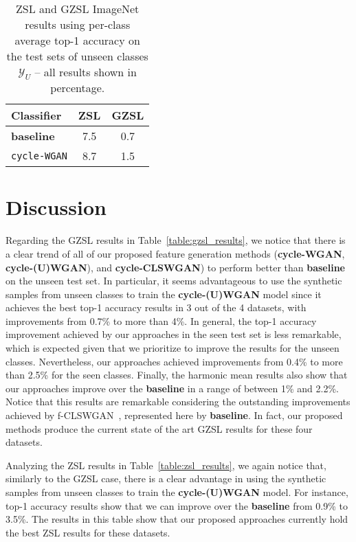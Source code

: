 \documentclass[runningheads]{llncs}
\begin{document}
\begin{table}
\centering
\caption{ZSL and GZSL ImageNet results using per-class average top-1 accuracy on the test sets of unseen classes $\mathcal{Y}_U$ -- all results shown in percentage.}
\label{table:zsl_imagenet}
\centering
\begin{tabular}{lcc}
\hline
\textbf{Classifier}  & \textbf{ZSL} & \textbf{GZSL}
\\ 
\hline
\textbf{baseline}~\cite{XianCVPR2018} & 7.5 & 0.7 \\
\texttt{cycle-WGAN}  & 8.7 & 1.5\\
\hline
\end{tabular}
\end{table}



\section{Discussion}
\label{sec:discussion}

Regarding the GZSL results in Table~\ref{table:gzsl_results}, we notice that there is a clear trend of all of our proposed feature generation methods (\textbf{cycle-WGAN}, \textbf{cycle-(U)WGAN}), and \textbf{cycle-CLSWGAN}) to perform better than \textbf{baseline} on the unseen test set.  In particular, it seems advantageous to use the synthetic samples from unseen classes to train the \textbf{cycle-(U)WGAN} model since it achieves the best top-1 accuracy results in 3 out of the 4 datasets, with improvements from 0.7\% to more than 4\%.  In general, the top-1 accuracy improvement achieved by our approaches in the seen test set is less remarkable, which is expected given that we prioritize to improve the results for the unseen classes.  Nevertheless, our approaches achieved improvements from 0.4\% to more than 2.5\% for the seen classes.  Finally, the harmonic mean results also show that our approaches improve over the \textbf{baseline} in a range of between 1\% and 2.2\%.  Notice that this results are remarkable considering the outstanding improvements achieved by f-CLSWGAN~\cite{XianCVPR2018}, represented here by \textbf{baseline}.  In fact, our proposed methods produce the current state of the art GZSL results for these four datasets.

Analyzing the ZSL results in Table~\ref{table:zsl_results}, we again notice that, similarly to the GZSL case, there is a clear advantage in using the synthetic samples from unseen classes to train the \textbf{cycle-(U)WGAN} model.  For instance, top-1 accuracy results show that we can improve over the \textbf{baseline} from 0.9\% to 3.5\%. The results  in this table show that our proposed approaches currently hold the best ZSL results for these datasets.
\end{document}

